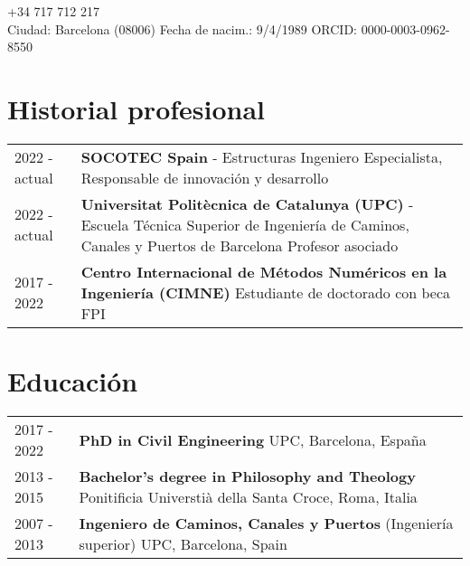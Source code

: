 \documentclass[12pt]{article}
\author{Dr. Ing. Miguel Masó}
\begin{document}
\maketitle
{} \qquad +34 717 712 217 \\
Ciudad: Barcelona (08006) \qquad
Fecha de nacim.: 9/4/1989 \qquad
ORCID: 0000-0003-0962-8550


\section{Historial profesional}
\begin{tabularx}{\linewidth}{lX}
    2022 - actual &
    \textbf{SOCOTEC Spain} - Estructuras \newline
    Ingeniero Especialista, Responsable de innovación y desarrollo \\

    2022 - actual &
    \textbf{Universitat Politècnica de Catalunya (UPC)} - Escuela Técnica Superior de Ingeniería de Caminos, Canales y Puertos de Barcelona \newline
    Profesor asociado \\ 

    2017 - 2022 &
    \textbf{Centro Internacional de Métodos Numéricos en la Ingeniería (CIMNE)} \newline
    Estudiante de doctorado con beca FPI \\
\end{tabularx}


\section{Educación}
\begin{tabularx}{\linewidth}{lX}
    2017 - 2022 &
    \textbf{PhD in Civil Engineering} \newline
    UPC, Barcelona, España \\

    2013 - 2015 &
    \textbf{Bachelor's degree in Philosophy and Theology} \newline
    Ponitificia Universtià della Santa Croce, Roma, Italia \\

    2007 - 2013 &
    \textbf{Ingeniero de Caminos, Canales y Puertos} (Ingeniería superior) \newline
    UPC, Barcelona, Spain \\
\end{tabularx}
\end{document}
